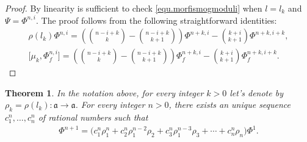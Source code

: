 \documentclass[pdftex]{sigma}
\numberwithin{equation}{section}
\newtheorem{Theorem}{Theorem}[section]
\begin{document}
\begin{proof} By linearity is suf\/f\/icient to check \eqref{equ.morfismogmoduli} when $l=l_k$ and $\Psi=\Phi^{n,i}$. The proof follows from the following straightforward identities:
\begin{gather*}%
\rho(l_k)\Phi^{n,i}=\left(\binom{n-i+k}{k}-\binom{n-i+k}{k+1}\right)\Phi^{n+k,i}-\binom{k+i}{k+1}\Phi^{n+k,i+k},\\
\big[\mu_k,\Phi^{n,i}_f\big]=\left(\binom{n-i+k}{k}-\binom{n-i+k}{k+1}\right)\Phi^{n+k,i}_f-\binom{k+i}{k+1}\Phi^{n+k,i+k}_f.\tag*{\qed}
\end{gather*}
\renewcommand{\qed}{}
\end{proof}

\begin{Theorem}\label{thm.basisforPhienne}
In the notation above, for every integer $k>0$ let's denote by $\rho_k=\rho(l_k)\colon \mathfrak{a}\to \mathfrak{a}$.
For every integer $n>0$, there exists an unique sequence $c^n_1,\ldots,c^n_n$ of rational numbers such that
\begin{gather*}\Phi^{n+1}=\big(c^n_1\rho_1^n+c^n_2\rho_1^{n-2}\rho_2+c^n_3\rho_1^{n-3}\rho_3+\cdots+c^n_n\rho_n\big)\Phi^1.\end{gather*}
\end{Theorem}
\end{document}
